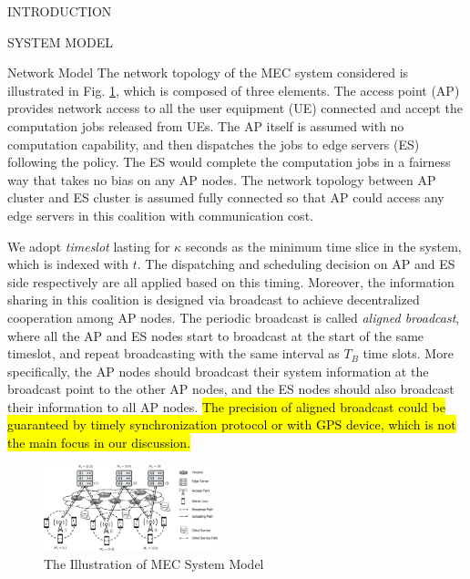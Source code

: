 \documentclass[10pt, conference, letterpaper]{IEEEtran}
\begin{document}
\begin{section}{INTRODUCTION}
    \end{section}

    \begin{section}{SYSTEM MODEL}
        \label{sec:model}
        \begin{subsection}{Network Model}
            The network topology of the MEC system considered is illustrated in Fig. \ref{fig:system}, which is composed of three elements. The access point (AP) provides network access to all the user equipment (UE) connected and accept the computation jobs released from UEs. The AP itself is assumed with no computation capability, and then dispatches the jobs to edge servers (ES) following the policy. The ES would complete the computation jobs in a fairness way that takes no bias on any AP nodes. The network topology between AP cluster and ES cluster is assumed fully connected so that AP could access any edge servers in this coalition with communication cost.

            We adopt \emph{timeslot} lasting for $\kappa$ seconds as the minimum time slice in the system, which is indexed with $t$. The dispatching and scheduling decision on AP and ES side respectively are all applied based on this timing. Moreover, the information sharing in this coalition is designed via broadcast to achieve decentralized cooperation among AP nodes.
            The periodic broadcast is called \emph{aligned broadcast}, where all the AP and ES nodes start to broadcast at the start of the same timeslot, and repeat broadcasting with the same interval as $T_B$ time slots. More specifically, the AP nodes should broadcast their system information at the broadcast point to the other AP nodes, and the ES nodes should also broadcast their information to all AP nodes. \hl{The precision of aligned broadcast could be guaranteed by timely synchronization protocol or with GPS device, which is not the main focus in our discussion.}
            \begin{figure}[ht]
                \centering
                \includegraphics[width=0.45\textwidth, trim={0.5cm 0.5cm 0.5cm 0.5cm}, clip]{system-model.pdf}
                \caption{The Illustration of MEC System Model}
                \label{fig:system}
            \end{figure}


\end{subsection}
\end{section}
\end{document}

